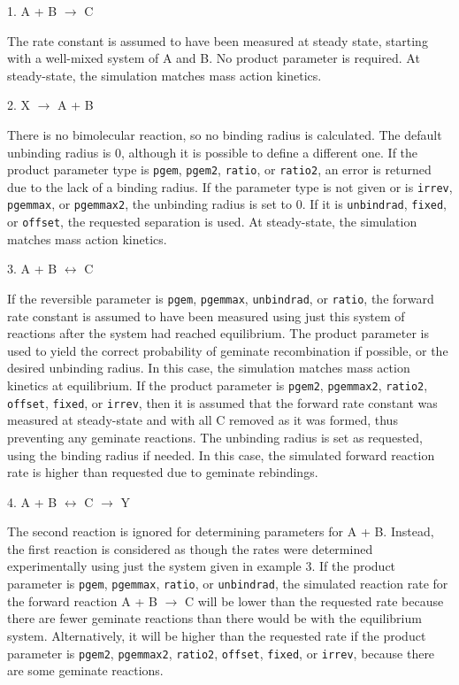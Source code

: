 \documentclass {scrbook}
\newcommand {\ttt} {\texttt}
\begin{document}
\begin{description}
\item{1. A + B $\rightarrow$ C}

The rate constant is assumed to have been measured at steady state, starting with a well-mixed system of A and B. No product parameter is required. At steady-state, the simulation matches mass action kinetics.

\item{2. X $\rightarrow$ A + B}

There is no bimolecular reaction, so no binding radius is calculated. The default unbinding radius is 0, although it is possible to define a different one. If the product parameter type is \ttt{pgem}, \ttt{pgem2}, \ttt{ratio}, or \ttt{ratio2}, an error is returned due to the lack of a binding radius. If the parameter type is not given or is \ttt{irrev}, \ttt{pgemmax}, or \ttt{pgemmax2}, the unbinding radius is set to 0. If it is \ttt{unbindrad}, \ttt{fixed}, or \ttt{offset}, the requested separation is used. At steady-state, the simulation matches mass action kinetics.

\item{3. A + B $\leftrightarrow$ C}

If the reversible parameter is \ttt{pgem}, \ttt{pgemmax}, \ttt{unbindrad}, or \ttt{ratio}, the forward rate constant is assumed to have been measured using just this system of reactions after the system had reached equilibrium. The product parameter is used to yield the correct probability of geminate recombination if possible, or the desired unbinding radius. In this case, the simulation matches mass action kinetics at equilibrium. If the product parameter is \ttt{pgem2}, \ttt{pgemmax2}, \ttt{ratio2}, \ttt{offset}, \ttt{fixed}, or \ttt{irrev}, then it is assumed that the forward rate constant was measured at steady-state and with all C removed as it was formed, thus preventing any geminate reactions. The unbinding radius is set as requested, using the binding radius if needed. In this case, the simulated forward reaction rate is higher than requested due to geminate rebindings.

\item{4. A + B $\leftrightarrow$ C $\rightarrow$ Y}

The second reaction is ignored for determining parameters for A + B. Instead, the first reaction is considered as though the rates were determined experimentally using just the system given in example 3. If the product parameter is \ttt{pgem}, \ttt{pgemmax}, \ttt{ratio}, or \ttt{unbindrad}, the simulated reaction rate for the forward reaction A + B $\rightarrow$ C will be lower than the requested rate because there are fewer geminate reactions than there would be with the equilibrium system. Alternatively, it will be higher than the requested rate if the product parameter is \ttt{pgem2}, \ttt{pgemmax2}, \ttt{ratio2}, \ttt{offset}, \ttt{fixed}, or \ttt{irrev}, because there are some geminate reactions.


\end{description}
\end{document}
